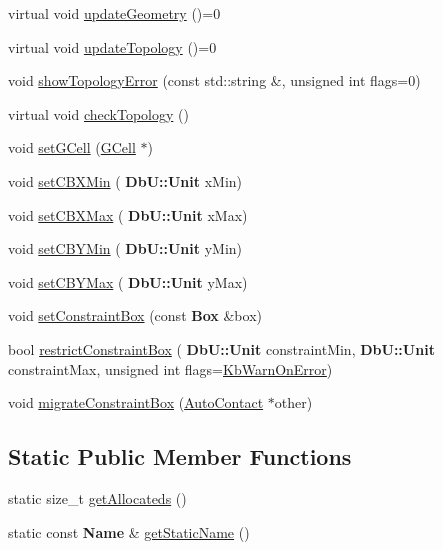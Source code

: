 \begin{DoxyCompactItemize}
\item 
virtual void \hyperlink{classKatabatic_1_1AutoContact_af6a2454547eeb7f5a519970dcb467e90}{update\+Geometry} ()=0
\item 
virtual void \hyperlink{classKatabatic_1_1AutoContact_a690764ddc997fe9766a79c4b8e0c3e2f}{update\+Topology} ()=0
\item 
void \hyperlink{classKatabatic_1_1AutoContact_a66f92d8233776fb858075f78af451997}{show\+Topology\+Error} (const std\+::string \&, unsigned int flags=0)
\item 
virtual void \hyperlink{classKatabatic_1_1AutoContact_ac371cd5b837a8965c11297c197e70a45}{check\+Topology} ()
\item 
void \hyperlink{classKatabatic_1_1AutoContact_aa1a02e206437f1371a74cafc724b00d7}{set\+G\+Cell} (\hyperlink{classKatabatic_1_1GCell}{G\+Cell} $\ast$)
\item 
void \hyperlink{classKatabatic_1_1AutoContact_a9fcb986110e79bc0044f7bfe503acc0c}{set\+C\+B\+X\+Min} (\textbf{ Db\+U\+::\+Unit} x\+Min)
\item 
void \hyperlink{classKatabatic_1_1AutoContact_aaa7652f5db46cab9edb066d06ea979f9}{set\+C\+B\+X\+Max} (\textbf{ Db\+U\+::\+Unit} x\+Max)
\item 
void \hyperlink{classKatabatic_1_1AutoContact_a5b598929b39ad3ec202405b31ac02b1d}{set\+C\+B\+Y\+Min} (\textbf{ Db\+U\+::\+Unit} y\+Min)
\item 
void \hyperlink{classKatabatic_1_1AutoContact_a1fdb3737d910a966e150a86d885f3c05}{set\+C\+B\+Y\+Max} (\textbf{ Db\+U\+::\+Unit} y\+Max)
\item 
void \hyperlink{classKatabatic_1_1AutoContact_a5e5f791613d0ef8f4cf9e7d8f35dc4c5}{set\+Constraint\+Box} (const \textbf{ Box} \&box)
\item 
bool \hyperlink{classKatabatic_1_1AutoContact_ac893802d1c5518cab86f8341af817abe}{restrict\+Constraint\+Box} (\textbf{ Db\+U\+::\+Unit} constraint\+Min, \textbf{ Db\+U\+::\+Unit} constraint\+Max, unsigned int flags=\hyperlink{namespaceKatabatic_a2af2ad6b6441614038caf59d04b3b217aa5153b2cc25ebccca8616ce20ecd727a}{Kb\+Warn\+On\+Error})
\item 
void \hyperlink{classKatabatic_1_1AutoContact_a7fc4029992d75a62ce718e5e622f8ce9}{migrate\+Constraint\+Box} (\hyperlink{classKatabatic_1_1AutoContact}{Auto\+Contact} $\ast$other)
\end{DoxyCompactItemize}
\subsection*{Static Public Member Functions}
\begin{DoxyCompactItemize}
\item 
static size\+\_\+t \hyperlink{classKatabatic_1_1AutoContact_a91c8bc1a6bdb1b15c3c084ebfd38af47}{get\+Allocateds} ()
\item 
static const \textbf{ Name} \& \hyperlink{classKatabatic_1_1AutoContact_a00e56270cfb31f56e52e31afbc33ba71}{get\+Static\+Name} ()
\end{DoxyCompactItemize}

